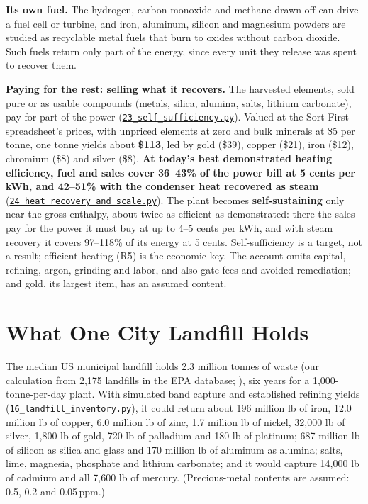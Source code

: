 \documentclass[11pt,a4paper]{article}
\newcommand{\gh}[2]{\href{https://github.com/syncaissa/paramanu-reclaimer/blob/main/#1}{\texttt{#2}}}
\theoremstyle{definition}
\theoremstyle{plain}
\theoremstyle{remark}
\begin{document}
\textbf{Its own fuel.} The hydrogen, carbon monoxide and methane drawn off can drive a fuel cell or turbine, and iron, aluminum, silicon and magnesium powders are studied as recyclable metal fuels that burn to oxides without carbon dioxide. Such fuels return only part of the energy, since every unit they release was spent to recover them.

\textbf{Paying for the rest: selling what it recovers.} The harvested elements, sold pure or as usable compounds (metals, silica, alumina, salts, lithium carbonate), pay for part of the power (\gh{simulation/scripts/23_self_sufficiency.py}{23\_self\_sufficiency.py}). Valued at the Sort-First spreadsheet's prices, with unpriced elements at zero and bulk minerals at \$5 per tonne, one tonne yields about \textbf{\$113}, led by gold (\$39), copper (\$21), iron (\$12), chromium (\$8) and silver (\$8). \textbf{At today's best demonstrated heating efficiency, fuel and sales cover 36--43\% of the power bill at 5 cents per kWh, and 42--51\% with the condenser heat recovered as steam} (\gh{simulation/scripts/24_heat_recovery_and_scale.py}{24\_heat\_recovery\_and\_scale.py}). The plant becomes \textbf{self-sustaining} only near the gross enthalpy, about twice as efficient as demonstrated: there the sales pay for the power it must buy at up to 4--5 cents per kWh, and with steam recovery it covers 97--118\% of its energy at 5 cents. Self-sufficiency is a target, not a result; efficient heating (R5) is the economic key. The account omits capital, refining, argon, grinding and labor, and also gate fees and avoided remediation; and gold, its largest item, has an assumed content.

\section{What One City Landfill Holds}\label{sec:landfill}

The median US municipal landfill holds 2.3 million tonnes of waste (our calculation from 2,175 landfills in the EPA database; \citealp{epa2024lmop}), six years for a 1,000-tonne-per-day plant. With simulated band capture and established refining yields \citep{hageluken2010,cusano2017bref} (\gh{simulation/scripts/16_landfill_inventory.py}{16\_landfill\_inventory.py}), it could return about 196 million lb of iron, 12.0 million lb of copper, 6.0 million lb of zinc, 1.7 million lb of nickel, 32,000 lb of silver, 1,800 lb of gold, 720 lb of palladium and 180 lb of platinum; 687 million lb of silicon as silica and glass and 170 million lb of aluminum as alumina; salts, lime, magnesia, phosphate and lithium carbonate; and it would capture 14,000 lb of cadmium and all 7,600 lb of mercury. (Precious-metal contents are assumed: 0.5, 0.2 and 0.05\,ppm.)
\end{document}
